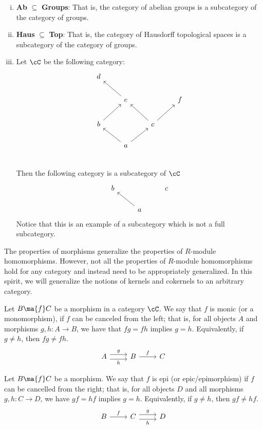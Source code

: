 \begin{ex} \hfill
	\begin{enumerate}[(i)]
	\item \textbf{Ab} $\subseteq$ \textbf{Groups}: That is, the category of abelian groups is a subcategory of the category of groups.
	\item \textbf{Haus} $\subseteq$ \textbf{Top}: That is, the category of Hausdorff topological spaces is a subcategory of the category of groups. 
	\item Let $\cC$ be the following category:
		\[
		\begin{tikzcd}
		d &  &  &  \\ 
		& e \arrow{ul} &  & f \\ 
		b \arrow{ur} &  & c \arrow{ul} \arrow{ur} &  \\ 
 		& a \arrow{ur} \arrow{ul} &  &  \\ 
		\end{tikzcd}
		\] 
	Then the following category is a subcategory of $\cC$
		\[
		\begin{tikzcd}
		b &  & c  \\ 
	 	& a \arrow{ul} 
		\end{tikzcd}
		\] 
	Notice that this is an example of a subcategory which is not a full subcategory. 
	\end{enumerate} \xqed 
\end{ex}


The properties of morphisms generalize the properties of $R$-module homomorphisms. However, not all the properties of $R$-module homomorphisms hold for any category and instead need to be appropriately generalized. In this spirit, we will generalize the notions of kernels and cokernels to an arbitrary category. 


\begin{dfn}[Monic]
Let $B \ma{f} C$ be a morphism in a category $\cC$. We say that $f$ is monic (or a monomorphism), if $f$ can be canceled from the left; that is, for all objects $A$ and morphisms $g,h: A \to B$, we have that $fg=fh$ implies $g=h$. Equivalently, if $g \neq h$, then $fg \neq fh$. 
	\[
	\begin{tikzcd}
	A \arrow[yshift=0.75ex]{r}{g} \arrow[yshift= -0.75ex,swap]{r}{h} & B \arrow{r}{f} & C
	\end{tikzcd}
	\]
\end{dfn}


\begin{dfn}[Epi]
Let $B \ma{f} C$ be a morphism. We say that $f$ is epi (or epic/epimorphism) if $f$ can be cancelled from the right; that is, for all objects $D$ and all morphisms $g,h: C \to D$, we have $gf=hf$ implies $g=h$. Equivalently, if $g \neq h$, then $gf \neq hf$. 
	\[
	\begin{tikzcd}
	B \arrow{r}{f} & C \arrow[yshift=0.75ex]{r}{g} \arrow[yshift= -0.75ex,swap]{r}{h} & D
	\end{tikzcd}
	\]
\end{dfn}


